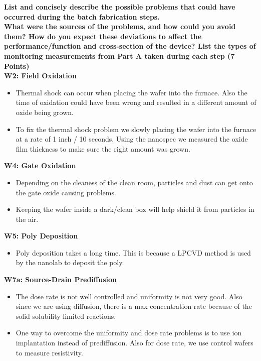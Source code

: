 \documentclass{article}
\begin{document}
\textbf{List and concisely describe the possible problems that could have occurred during
the batch fabrication steps.} \\
\textbf{What were the sources of the problems, and how could you avoid them? How do
you expect these deviations to affect the performance/function and cross-section of
the device? List the types of monitoring measurements from Part A taken during
each step (7 Points)} \\

\textbf{W2: Field Oxidation}
\begin{itemize}
\item Thermal shock can occur when placing the wafer into the furnace. Also the time of oxidation could have been wrong and resulted in a different amount of oxide being grown.
\item To fix the thermal shock problem we slowly placing the wafer into the furnace at a rate of 1 inch / 10 seconds. Using the nanospec we measured the oxide film thickness to make sure the right amount was grown.
\end{itemize}

\textbf{W4: Gate Oxidation}
\begin{itemize}
\item Depending on the cleaness of the clean room, particles and dust can get onto the gate oxide causing problems. 
\item Keeping the wafer inside a dark/clean box will help shield it from particles in the air.
\end{itemize}

\textbf{W5: Poly Deposition}
\begin{itemize}
\item Poly deposition takes a long time. This is because a LPCVD method is used by the nanolab to deposit the poly.
\end{itemize}

\textbf{W7a: Source-Drain Prediffusion}
\begin{itemize}
\item The dose rate is not well controlled and uniformity is not very good. Also since we are using diffusion, there is a max concentration rate because of the solid solubility limited reactions. 
\item One way to overcome the uniformity and dose rate problems is to use ion implantation instead of prediffusion. Also for dose rate, we use control wafers to measure resistivity.
\end{itemize}
\end{document}
